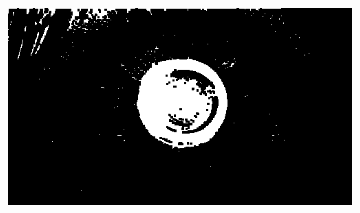 \documentclass{article}
\begin{document}
\begin{figure}[H]
\begin{subfigure}{.47\textwidth}
  \centering
  \includegraphics[width=0.97\linewidth]{_Figures/raw_data_1_closure.png}
  \caption{}
  \label{fig:raw_1_closure}
\end{subfigure}


\end{figure}
\end{document}
